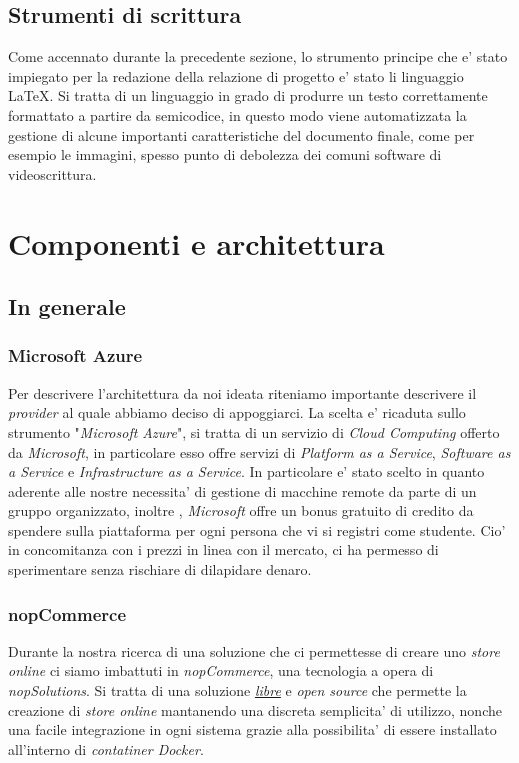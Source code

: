 \documentclass[a4paper]{report}
\begin{document}
	\section{Strumenti di scrittura}
		Come accennato durante la precedente sezione, lo strumento principe che e' stato impiegato per la redazione
		della relazione di progetto e' stato li linguaggio \LaTeX{}. Si tratta di un linguaggio in grado di produrre un
		testo correttamente formattato a partire da semicodice, in questo modo viene automatizzata la gestione di alcune
		importanti caratteristiche del documento finale, come per esempio le immagini, spesso punto di debolezza dei
		comuni software di videoscrittura.
\chapter{Componenti e architettura}
	\section{In generale}
		\subsection{Microsoft Azure}
			Per descrivere l'architettura da noi ideata riteniamo importante descrivere il \emph{provider} al quale
			abbiamo deciso di appoggiarci. La scelta e' ricaduta sullo strumento "\emph{Microsoft Azure}", si tratta
			di un servizio di \emph{Cloud Computing} offerto da \emph{Microsoft}, in particolare esso offre servizi di
			\emph{Platform as a Service}, \emph{Software as a Service} e \emph{Infrastructure as a Service}.
			In particolare e' stato scelto in quanto aderente alle nostre necessita' di gestione di macchine remote da
			parte di un gruppo organizzato, inoltre , \emph{Microsoft} offre un bonus gratuito di credito da spendere
			sulla piattaforma per ogni persona che vi si registri come studente. Cio' in concomitanza con i prezzi in
			linea con il mercato, ci ha permesso di sperimentare senza rischiare di dilapidare denaro.
		\subsection{nopCommerce}
			Durante la nostra ricerca di una soluzione che ci permettesse di creare uno \emph{store online} ci siamo
			imbattuti in \emph{nopCommerce}, una tecnologia a opera di \emph{nopSolutions}. Si tratta di una soluzione
			\href{https://github.com/nopSolutions/nopCommerce/blob/develop/LICENSE.md}{\emph{libre}} e
			\emph{open source} che permette la creazione di \emph{store online} mantanendo una discreta
			semplicita' di utilizzo, nonche una facile integrazione in ogni sistema grazie alla possibilita' di essere
			installato all'interno di \emph{contatiner Docker}.
\end{document}

